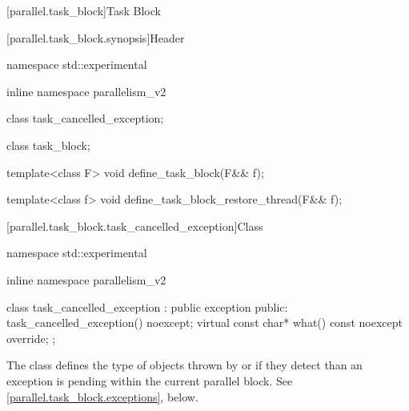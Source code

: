 
[parallel.task_block]{Task Block}

[parallel.task_block.synopsis]{Header }

\begin{codeblock}
namespace std::experimental {
inline namespace parallelism_v2 {
  class task_cancelled_exception;

  class task_block;

  template<class F>
    void define_task_block(F&& f);

  template<class f>
    void define_task_block_restore_thread(F&& f);
}
}
\end{codeblock}

[parallel.task_block.task_cancelled_exception]{Class }

\begin{codeblock}
namespace std::experimental {
inline namespace parallelism_v2 {

  class task_cancelled_exception : public exception
  {
    public:
      task_cancelled_exception() noexcept;
      virtual const char* what() const noexcept override;
  };
}
}
\end{codeblock}

\pnum The class  defines the type of objects
thrown by  or  if they detect
than an exception is pending within the current parallel block. See
\ref{parallel.task_block.exceptions}, below.

